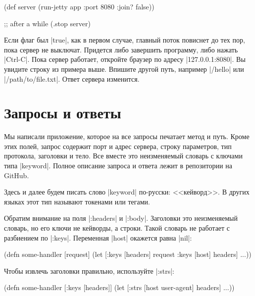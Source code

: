 \begin{english}
  \begin{clojure}
(def server
  (run-jetty app {:port 8080 :join? false}))

;; after a while
(.stop server)
  \end{clojure}
\end{english}

Если флаг был \spverb|true|, как в первом случае, главный поток повиснет до тех
пор, пока сервер не выключат. Придется либо завершить программу, либо нажать
\spverb|Ctrl-C|. Пока сервер работает, откройте браузер по адресу
\spverb|127.0.0.1:8080|. Вы увидите строку из примера выше. Впишите другой путь,
например \spverb|/hello| или \spverb|/path/to/file.txt|. Ответ сервера
изменится.

\section{Запросы и ответы}

Мы написали приложение, которое на все запросы печатает метод и путь. Кроме этих
полей, запрос содержит порт и адрес сервера, строку параметров, тип протокола,
заголовки и тело. Все вместе это неизменяемый словарь с ключами типа
\spverb|keyword|. Полное описание запроса и ответа лежит в репозитории на
GitHub.

Здесь и далее будем писать слово \spverb|keyword| по-русски: <<кейворд>>. В
других языках этот тип называют токенами или тегами.

Обратим внимание на поля \spverb|:headers| и \spverb|:body|. Заголовки это
неизменяемый словарь, но его ключи не кейворды, а строки. Такой словарь не
работает с разбиением по \spverb|:keys|. Переменная \spverb|host| окажется равна
\spverb|nil|:

\begin{english}
  \begin{clojure}
(defn some-handler
  [request]
  (let [{:keys [headers]} request
        {:keys [host]} headers]
    ...))
  \end{clojure}
\end{english}

Чтобы извлечь заголовки правильно, используйте \spverb|:strs|:

\begin{english}
  \begin{clojure}
(defn some-handler
  [{:keys [headers]}]
  (let [{:strs [host user-agent]} headers]
    ...))
  \end{clojure}
\end{english}

